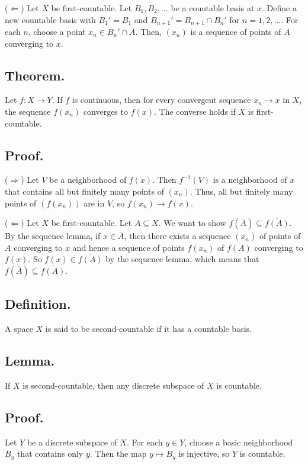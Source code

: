 \documentclass[titlepage]{article}
\begin{document}
($\Leftarrow$) Let $X$ be first-countable. Let $B_{1}, B_{2}, \ldots$ be a countable basis at $x$. Define a new countable basis with $B_{1}' = B_{1}$ and $B_{n+1}' = B_{n+1} \cap B_{n}'$ for $n = 1, 2, \ldots$. For each $n$, choose a point $x_{n} \in B_{n}' \cap A$. Then, $(x_{n})$ is a sequence of points of $A$ converging to $x$.

\subsection{Theorem.} Let $f: X \to Y$. If $f$ is continuous, then for every convergent sequence $x_{n} \to x$ in $X$, the sequence $f(x_{n})$ converges to $f(x)$. The converse holds if $X$ is first-countable.

\subsection{Proof.}

($\Rightarrow$) Let $V$ be a neighborhood of $f(x)$. Then $f^{-1}(V)$ is a neighborhood of $x$ that contains all but finitely many points of $(x_{n})$. Thus, all but finitely many points of $(f(x_{n}))$ are in $V$, so $f(x_{n}) \to f(x)$.

($\Leftarrow$) Let $X$ be first-countable. Let $A \subseteq X$. We want to show $f(\overline{A}) \subseteq \overline{f(A)}$. By the sequence lemma, if $x \in \overline{A}$, then there exists a sequence $(x_{n})$ of points of $A$ converging to $x$ and hence a sequence of points $f(x_{n})$ of $f(A)$ converging to $f(x)$. So $f(x) \in \overline{f(A)}$ by the sequence lemma, which means that $f(\overline{A}) \subseteq \overline{f(A)}$.

\subsection{Definition.} A space $X$ is said to be second-countable if it has a countable basis.

\subsection{Lemma.} If $X$ is second-countable, then any discrete subspace of $X$ is countable.

\subsection{Proof.} Let $Y$ be a discrete subspace of $X$. For each $y \in Y$, choose a basic neighborhood $B_{y}$ that contains only $y$. Then the map $y \mapsto B_{y}$ is injective, so $Y$ is countable.
\end{document}

